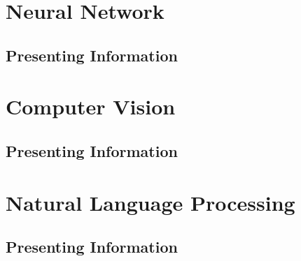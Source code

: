 \documentclass[11pt,fleqn]{book} %
\begin{document}

\part{Neural Network}


\chapter{Presenting Information}

%


\part{Computer Vision}


\chapter{Presenting Information}

%


\part{Natural Language Processing}


\chapter{Presenting Information}

%
\end{document}
